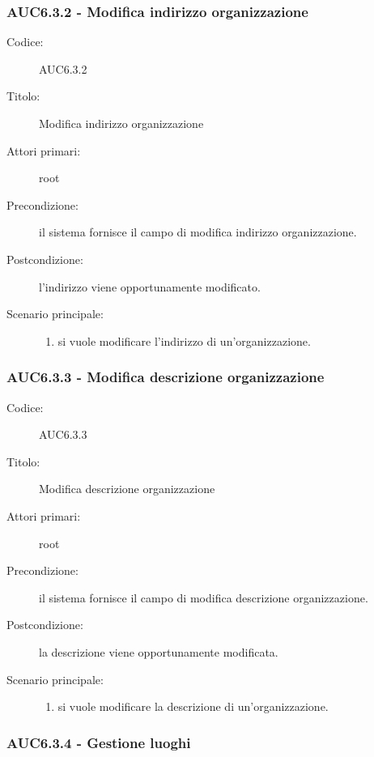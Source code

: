 \documentclass[casi-duso]{subfiles}
\begin{document}
\subsubsection{AUC6.3.2 - Modifica indirizzo organizzazione}%
\label{subsub:AUC6.3.2}
\begin{description}
  \item[Codice:] AUC6.3.2
  \item[Titolo:] Modifica indirizzo organizzazione
  \item[Attori primari:] root
  \item[Precondizione:] il sistema fornisce il campo di modifica indirizzo organizzazione.
  \item[Postcondizione:] l'indirizzo viene opportunamente modificato.
  \item[Scenario principale:]
  \begin{enumerate}
    \item si vuole modificare l'indirizzo di un'organizzazione.
  \end{enumerate}
\end{description}

\subsubsection{AUC6.3.3 - Modifica descrizione organizzazione}%
\label{subsub:AUC6.3.3}
\begin{description}
  \item[Codice:] AUC6.3.3
  \item[Titolo:] Modifica descrizione organizzazione
  \item[Attori primari:] root
  \item[Precondizione:] il sistema fornisce il campo di modifica descrizione organizzazione.
  \item[Postcondizione:] la descrizione viene opportunamente modificata.
  \item[Scenario principale:]
  \begin{enumerate}
    \item si vuole modificare la descrizione di un'organizzazione.
  \end{enumerate}
\end{description}

\subsubsection{AUC6.3.4 - Gestione luoghi}%
\label{subsub:AUC6.3.4}
\end{document}
